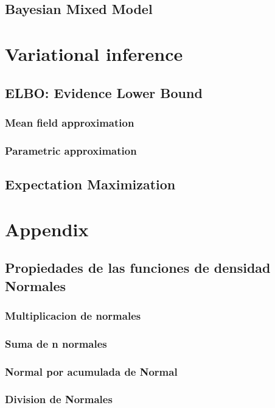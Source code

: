 \documentclass[a4paper,10pt]{book}
\begin{document}
    
    
    \section{Bayesian Mixed Model}
    
    
        
\chapter{Variational inference}

\section{ELBO: Evidence Lower Bound}



\subsection{Mean field approximation}



\subsection{Parametric approximation}



\section{Expectation Maximization}



\chapter{Appendix}

\section{Propiedades de las funciones de densidad Normales}


\subsection{Multiplicacion de normales}\label{multiplicacion_normales}


\subsection{Suma de n normales}\label{suma_normales_induccion}


\subsection{Normal por acumulada de Normal}


\subsection{Division de Normales}\label{sec:division_normales}

\end{document}
